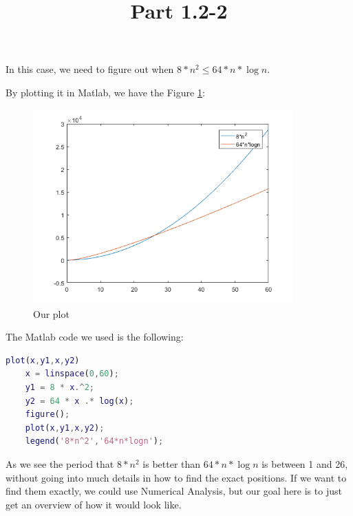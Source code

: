 \documentclass{article}
\title{Part 1.2-2}
\begin{document}
\date{}
\author{}

\maketitle

In this case, we need to figure out when $ 8 * n^{2} \leq 64* n * \log{n} $.

By plotting it in Matlab, we have the Figure \ref{fig:plot1}:

\begin{figure}
    \includegraphics[width=10cm]{1-2-2.png}
    \centering
    \caption{Our plot}
    \label{fig:plot1}
\end{figure}

The Matlab code we used is the following:

\begin{lstlisting}[language=Matlab]
    plot(x,y1,x,y2)
    x = linspace(0,60);
    y1 = 8 * x.^2;
    y2 = 64 * x .* log(x);
    figure();
    plot(x,y1,x,y2);
    legend('8*n^2','64*n*logn');
\end{lstlisting}

As we see the period that $8*n^{2}$ is better than $64*n*\log{n}$ is between 1 and 26, without going into much details in how to find the exact positions. If we want to find them exactly, we could use Numerical Analysis, but our goal here is to just get an overview of how it would look like.
\end{document}
